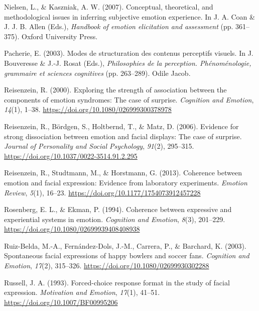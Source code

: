 \documentclass[
  english,
  doc]{apa7}
\newlength{\cslhangindent}
\newenvironment{cslreferences}%
  {\setlength{\parindent}{0pt}%
  \everypar{\setlength{\hangindent}{\cslhangindent}}\ignorespaces}%
  {\par}
\begin{document}
\begin{cslreferences}
\leavevmode\hypertarget{ref-nielsen2007conceptual}{}%
Nielsen, L., \& Kaszniak, A. W. (2007). Conceptual, theoretical, and methodological issues in inferring subjective emotion experience. In J. A. Coan \& J. J. B. Allen (Eds.), \emph{Handbook of emotion elicitation and assessment} (pp. 361--375). Oxford University Press.

\leavevmode\hypertarget{ref-pacherie2003modes}{}%
Pacherie, E. (2003). Modes de structuration des contenus perceptifs visuels. In J. Bouveresse \& J.-J. Rosat (Eds.), \emph{Philosophies de la perception. Phénoménologie, grammaire et sciences cognitives} (pp. 263--289). Odile Jacob.

\leavevmode\hypertarget{ref-reisenzein2000exploring}{}%
Reisenzein, R. (2000). Exploring the strength of association between the components of emotion syndromes: The case of surprise. \emph{Cognition and Emotion}, \emph{14}(1), 1--38. \url{https://doi.org/10.1080/026999300378978}

\leavevmode\hypertarget{ref-reisenzein2006evidence}{}%
Reisenzein, R., Bördgen, S., Holtbernd, T., \& Matz, D. (2006). Evidence for strong dissociation between emotion and facial displays: The case of surprise. \emph{Journal of Personality and Social Psychology}, \emph{91}(2), 295--315. \url{https://doi.org/10.1037/0022-3514.91.2.295}

\leavevmode\hypertarget{ref-reisenzein2013coherence}{}%
Reisenzein, R., Studtmann, M., \& Horstmann, G. (2013). Coherence between emotion and facial expression: Evidence from laboratory experiments. \emph{Emotion Review}, \emph{5}(1), 16--23. \url{https://doi.org/10.1177/1754073912457228}

\leavevmode\hypertarget{ref-rosenberg1994coherence}{}%
Rosenberg, E. L., \& Ekman, P. (1994). Coherence between expressive and experiential systems in emotion. \emph{Cognition and Emotion}, \emph{8}(3), 201--229. \url{https://doi.org/10.1080/02699939408408938}

\leavevmode\hypertarget{ref-ruiz2003spontaneous}{}%
Ruiz-Belda, M.-A., Fernández-Dols, J.-M., Carrera, P., \& Barchard, K. (2003). Spontaneous facial expressions of happy bowlers and soccer fans. \emph{Cognition and Emotion}, \emph{17}(2), 315--326. \url{https://doi.org/10.1080/02699930302288}

\leavevmode\hypertarget{ref-russell1993forced}{}%
Russell, J. A. (1993). Forced-choice response format in the study of facial expression. \emph{Motivation and Emotion}, \emph{17}(1), 41--51. \url{https://doi.org/10.1007/BF00995206}


\end{cslreferences}
\end{document}
